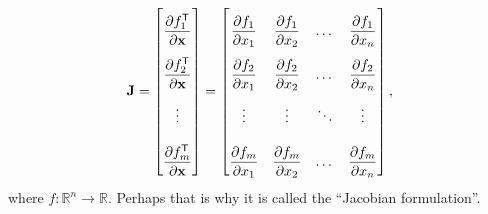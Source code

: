 \documentclass{article}
\newcommand{\trans}{\mathsf{T}}
\begin{document}
\begin{align}
    \mathbf{J} = \renewcommand{\arraystretch}{2.6} \begin{bmatrix}
        \dfrac{\partial f_1^\trans}{\partial \mathbf{x}} \\
        \dfrac{\partial f_2^\trans}{\partial \mathbf{x}} \\ 
        \vdots \\ 
        \dfrac{\partial f_m^\trans}{\partial \mathbf{x}}
    \end{bmatrix} = \begin{bmatrix}
        \dfrac{\partial f_1}{\partial x_1} & \dfrac{\partial f_1}{\partial x_2} & \dots & \dfrac{\partial f_1}{\partial x_n} \\
        \dfrac{\partial f_2}{\partial x_1} & \dfrac{\partial f_2}{\partial x_2} & \dots & \dfrac{\partial f_2}{\partial x_n} \\
        \vdots & \vdots & \ddots & \vdots \\
        \dfrac{\partial f_m}{\partial x_1} & \dfrac{\partial f_m}{\partial x_2} & \dots & \dfrac{\partial f_m}{\partial x_n} \\
    \end{bmatrix},
\end{align}
where \(f: \mathbb{R}^n \rightarrow \mathbb{R}\). Perhaps that is why it is called the ``Jacobian formulation''.
\end{document}
